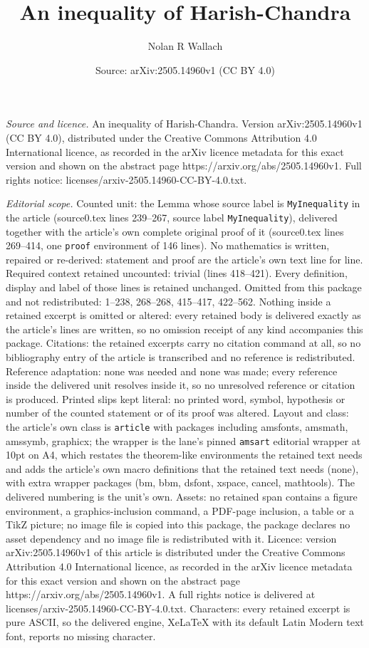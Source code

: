 \documentclass[10pt,a4paper]{amsart}
\title[An inequality of Harish-Chandra]{An inequality of Harish-Chandra}
\author{Nolan R Wallach}
\date{Source: arXiv:2505.14960v1 (CC BY 4.0)}
\begin{document}
\maketitle

\noindent\emph{Source and licence.} An inequality of Harish-Chandra. Version arXiv:2505.14960v1 (CC BY 4.0), distributed under the Creative Commons Attribution 4.0 International licence, as recorded in the arXiv licence metadata for this exact version and shown on the abstract page https://arxiv.org/abs/2505.14960v1. Full rights notice: licenses/arxiv-2505.14960-CC-BY-4.0.txt.\par\smallskip

\noindent\textit{Editorial scope.} Counted unit: the Lemma whose source label is \texttt{MyInequality} in the article (source0.tex lines 239--267, source label \texttt{MyInequality}), delivered together with the article's own complete original proof of it (source0.tex lines 269--414, one \texttt{proof} environment of 146 lines). No mathematics is written, repaired or re-derived: statement and proof are the article's own text line for line. Required context retained uncounted: trivial (lines 418--421). Every definition, display and label of those lines is retained unchanged. Omitted from this package and not redistributed: 1--238, 268--268, 415--417, 422--562. Nothing inside a retained excerpt is omitted or altered: every retained body is delivered exactly as the article's lines are written, so no omission receipt of any kind accompanies this package. Citations: the retained excerpts carry no citation command at all, so no bibliography entry of the article is transcribed and no reference is redistributed. Reference adaptation: none was needed and none was made; every reference inside the delivered unit resolves inside it, so no unresolved reference or citation is produced. Printed slips kept literal: no printed word, symbol, hypothesis or number of the counted statement or of its proof was altered. Layout and class: the article's own class is \texttt{article} with packages including amsfonts, amsmath, amssymb, graphicx; the wrapper is the lane's pinned \texttt{amsart} editorial wrapper at 10pt on A4, which restates the theorem-like environments the retained text needs and adds the article's own macro definitions that the retained text needs (none), with extra wrapper packages (bm, bbm, dsfont, xspace, cancel, mathtools). The delivered numbering is the unit's own. Assets: no retained span contains a figure environment, a graphics-inclusion command, a PDF-page inclusion, a table or a TikZ picture; no image file is copied into this package, the package declares no asset dependency and no image file is redistributed with it. Licence: version arXiv:2505.14960v1 of this article is distributed under the Creative Commons Attribution 4.0 International licence, as recorded in the arXiv licence metadata for this exact version and shown on the abstract page https://arxiv.org/abs/2505.14960v1. A full rights notice is delivered at licenses/arxiv-2505.14960-CC-BY-4.0.txt. Characters: every retained excerpt is pure ASCII, so the delivered engine, XeLaTeX with its default Latin Modern text font, reports no missing character.
\end{document}
